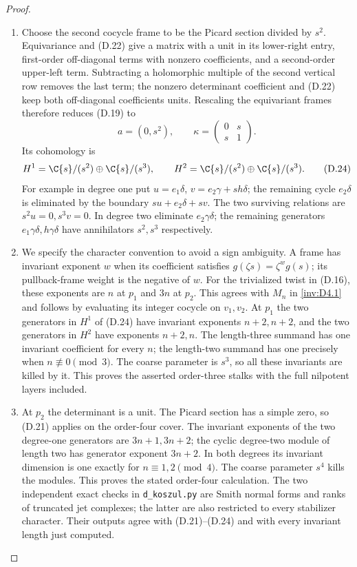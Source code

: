 \begin{proof}
\begin{enumerate}[label=\arabic*.,leftmargin=*]
\item Choose the second cocycle frame to be the Picard section divided by
$s^2$. Equivariance and (D.22) give a matrix with a unit in its
lower-right entry, first-order off-diagonal terms with nonzero
coefficients, and a second-order upper-left term. Subtracting a
holomorphic multiple of the second vertical row removes the last
term; the nonzero determinant coefficient and (D.22) keep both
off-diagonal coefficients units. Rescaling the equivariant frames
therefore reduces (D.19) to
\[
 a=(0,s^2),\qquad \kappa=\begin{pmatrix}0&s\\s&1\end{pmatrix}. \tag{D.23}
\]
Its cohomology is
\[
 H^1=\C\{s\}/(s^2)\oplus\C\{s\}/(s^3),\qquad
 H^2=\C\{s\}/(s^2)\oplus\C\{s\}/(s^3).             \tag{D.24}
\]
For example in degree one put
$u=e_1\delta$, $v=e_2\gamma+s h\delta$; the remaining cycle
$e_2\delta$ is eliminated by the boundary
$s u+e_2\delta+s v$. The two surviving relations are
$s^2u=0,s^3v=0$. In degree two eliminate $e_2\gamma\delta$;
the remaining generators $e_1\gamma\delta,h\gamma\delta$
have annihilators $s^2,s^3$ respectively.

\item We specify the character convention to avoid a sign ambiguity.
A frame has invariant exponent $w$ when its coefficient satisfies
$g(\zeta s)=\zeta^w g(s)$; its pullback-frame weight is the negative
of $w$. For the trivialized twist in (D.16), these exponents are
$n$ at $p_1$ and $3n$ at $p_2$. This agrees with $M_n$ in \ref{inv:D4.1}
and follows by evaluating its integer cocycle on $v_1,v_2$.
At $p_1$ the two generators in $H^1$ of (D.24) have invariant
exponents $n+2,n+2$, and the two generators in $H^2$ have exponents
$n+2,n$. The length-three summand has one invariant coefficient
for every $n$; the length-two summand has one precisely when
$n\not\equiv0\pmod3$. The coarse parameter is $s^3$, so all these
invariants are killed by it. This proves the asserted order-three
stalks with the full nilpotent layers included.

\item At $p_2$ the determinant is a unit. The Picard section has a simple
zero, so (D.21) applies on the order-four cover. The invariant
exponents of the two degree-one generators are $3n+1,3n+2$;
the cyclic degree-two module of length two has generator exponent
$3n+2$. In both degrees its invariant dimension is one exactly for
$n\equiv1,2\pmod4$. The coarse parameter $s^4$ kills the modules.
This proves the stated order-four calculation. The two independent
exact checks in \texttt{d\_koszul.py} are Smith normal forms and
ranks of truncated jet complexes; the latter are also restricted to
every stabilizer character. Their outputs agree with (D.21)--(D.24)
and with every invariant length just computed.
\end{enumerate}
\end{proof}

